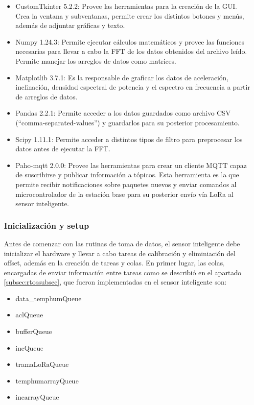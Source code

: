 \begin{itemize}
    \item CustomTkinter 5.2.2: Provee las herramientas para la creación de la GUI. Crea la ventana y subventanas, permite crear los distintos botones y menús, además de adjuntar gráficas y texto.
    \item Numpy 1.24.3: Permite ejecutar cálculos matemáticos y provee las funciones necesarias para llevar a cabo la FFT de los datos obtenidos del archivo leído. Permite manejar los arreglos de datos como matrices.
    \item Matplotlib 3.7.1: Es la responsable de graficar los datos de aceleración, inclinación, densidad espectral de potencia y el espectro en frecuencia a partir de arreglos de datos.
    \item Pandas 2.2.1: Permite acceder a los datos guardados como archivo CSV (``comma-separated-values'') y guardarlos para su posterior procesamiento.
    \item Scipy 1.11.1: Permite acceder a distintos tipos de filtro para preprocesar los datos antes de ejecutar la FFT.
    \item Paho-mqtt 2.0.0: Provee las herramientas para crear un cliente MQTT capaz de suscribirse y publicar información a tópicos. Esta herramienta es la que permite recibir notificaciones sobre paquetes nuevos y enviar comandos al microcontrolador de la estación base para su posterior envío vía LoRa al sensor inteligente.
\end{itemize}



\subsubsection{Inicialización y setup}

Antes de comenzar con las rutinas de toma de datos, el sensor inteligente debe inicializar el hardware y llevar a cabo tareas de calibración y eliminiación del offset, además en la creación de tareas y colas. En primer lugar, las colas, encargadas de enviar información entre tareas como se describió en el apartado \ref{subsec:rtossubsec}, que fueron implementadas en el sensor inteligente son:

\begin{itemize}
    \item data\_temphumQueue
    \item aclQueue
    \item bufferQueue
    \item incQueue
    \item tramaLoRaQueue
    \item temphumarrayQueue
    \item incarrayQueue
\end{itemize}


